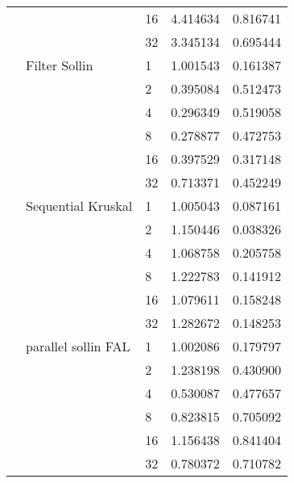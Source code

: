 \begin{tabular}{lllrr}
                                                       &                     & 16 &  4.414634 &  0.816741 \\
                                                       &                     & 32 &  3.345134 &  0.695444 \\
                                                       & Filter Sollin & 1  &  1.001543 &  0.161387 \\
                                                       &                     & 2  &  0.395084 &  0.512473 \\
                                                       &                     & 4  &  0.296349 &  0.519058 \\
                                                       &                     & 8  &  0.278877 &  0.472753 \\
                                                       &                     & 16 &  0.397529 &  0.317148 \\
                                                       &                     & 32 &  0.713371 &  0.452249 \\
                                                       & Sequential Kruskal & 1  &  1.005043 &  0.087161 \\
                                                       &                     & 2  &  1.150446 &  0.038326 \\
                                                       &                     & 4  &  1.068758 &  0.205758 \\
                                                       &                     & 8  &  1.222783 &  0.141912 \\
                                                       &                     & 16 &  1.079611 &  0.158248 \\
                                                       &                     & 32 &  1.282672 &  0.148253 \\
                                                       & parallel sollin FAL & 1  &  1.002086 &  0.179797 \\
                                                       &                     & 2  &  1.238198 &  0.430900 \\
                                                       &                     & 4  &  0.530087 &  0.477657 \\
                                                       &                     & 8  &  0.823815 &  0.705092 \\
                                                       &                     & 16 &  1.156438 &  0.841404 \\
                                                       &                     & 32 &  0.780372 &  0.710782 \\
\bottomrule
\end{tabular}

